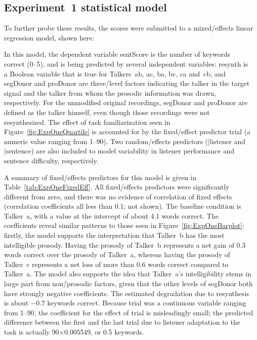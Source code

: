 \subsection{Experiment~1 statistical model}
To further probe these results, the scores were submitted to a mixed\-/effects linear regression model, shown here:%


In this model, the dependent variable {\inlinecode sentScore} is the number of keywords correct (0–5), and is being predicted by several independent variables: {\inlinecode resynth} is a Boolean variable that is true for Talkers~\ac{ab}, \ac{ac}, \ac{ba}, \ac{bc}, \ac{ca} and~\ac{cb}, and {\inlinecode segDonor} and {\inlinecode proDonor} are three\-/level factors indicating the talker in the target signal and the talker from whom the prosodic information was drawn, respectively.  For the unmodified original recordings, {\inlinecode segDonor} and {\inlinecode proDonor} are defined as the talker himself, even though those recordings were not resynthesized.  The effect of task familiarization seen in Figure~\ref{fig:ExpOneQuartile} is accounted for by the fixed\-/effect predictor {\inlinecode trial} (a numeric value ranging from 1–90).  Two random\-/effects predictors ({|listener} and {|sentence}) are also included to model variability in listener performance and sentence difficulty, respectively. 

A summary of fixed\-/effects predictors for this model is given in Table~\ref{tab:ExpOneFixedEff}.  All fixed\-/effects predictors were significantly different from zero, and there was no evidence of correlation of fixed effects (correlation coefficients all less than 0.1; not shown).  The baseline condition is Talker~\ac{a}, with a value at the intercept of about 4.1 words correct.  The coefficients reveal similar patterns to those seen in Figure~\ref{fig:ExpOneBarplot}: firstly, the model supports the interpretation that Talker~\ac{b} has the most intelligible prosody.  Having the prosody of Talker~\ac{b} represents a net gain of 0.3 words correct over the prosody of Talker~\ac{a}, whereas having the prosody of Talker~\ac{c} represents a net loss of more than 0.6 words correct compared to Talker~\ac{a}.  The model also supports the idea that Talker~\ac{a}’s intelligibility stems in large part from non\=/prosodic factors, given that the other levels of {\inlinecode segDonor} both have strongly negative coefficients.  The estimated degradation due to resynthesis is about −0.7 keywords correct.  Because trial was a continuous variable ranging from 1–90, the coefficient for the effect of trial is misleadingly small; the predicted difference between the first and the last trial due to listener adaptation to the task is actually 90×0.005549, or 0.5 keywords.

